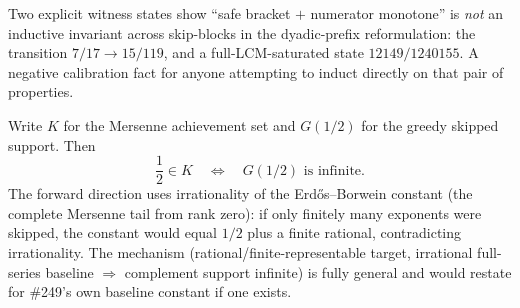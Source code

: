 \begin{obs}
\label{obs:skip-block-non-invariant}
Two explicit witness states show ``safe bracket $+$ numerator monotone'' is \emph{not}
an inductive invariant across skip-blocks in the dyadic-prefix reformulation: the
transition $7/17\to 15/119$, and a full-LCM-saturated state
$12149/1240155$. A negative calibration fact for anyone attempting to induct directly on
that pair of properties.
\par{}
\end{obs}

\begin{thm}
\label{thm:half-skip-dichotomy}
Write $K$ for the Mersenne achievement set and $G(1/2)$ for the greedy skipped support. Then
\[
\frac12\in K \quad\Longleftrightarrow\quad G(1/2)\text{ is infinite}.
\]
The forward direction uses irrationality of the Erd\H{o}s--Borwein constant (the complete
Mersenne tail from rank zero):
if only finitely many exponents were skipped, the constant would equal $1/2$ plus a
finite rational, contradicting irrationality. The mechanism (rational/finite-representable
target, irrational full-series baseline $\Rightarrow$ complement support infinite) is
fully general and would restate for \#249's own baseline constant if one exists.
\par{}
\end{thm}

